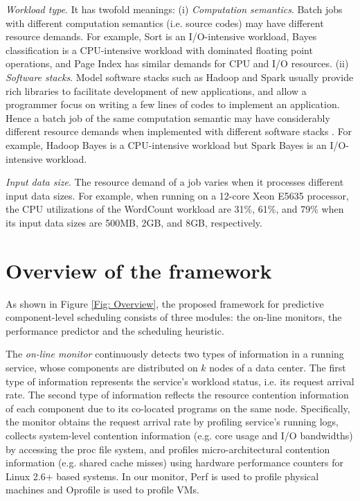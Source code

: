 \documentclass[10pt, conference, compsocconf]{IEEEtran}
\begin{document}
\emph{Workload type}. It has twofold meanings: (i) \emph{Computation semantics}. Batch jobs with different computation semantics (i.e. source codes) may have different resource demands. For example, Sort is an I/O-intensive workload, Bayes classification is a CPU-intensive workload with dominated floating point operations, and Page Index has similar demands for CPU and I/O resources. (ii) \emph{Software stacks}. Model software stacks such as Hadoop and Spark usually provide rich libraries to facilitate development of new applications, and allow a programmer focus on writing a few lines of codes to implement an application. Hence a batch job of the same computation semantic may have considerably different resource demands when implemented with different software stacks \cite{jia2014characterizing}. For example, Hadoop Bayes is a CPU-intensive workload but Spark Bayes is an I/O-intensive workload.

\emph{Input data size}. The resource demand of a job varies when it processes different input data sizes. For example, when running on a 12-core Xeon E5635 processor, the CPU utilizations of the WordCount workload are 31\%, 61\%, and 79\% when its input data sizes are 500MB, 2GB, and 8GB, respectively.




















\section{Overview of the framework} \label{Section: Overview of the framework}

As shown in Figure \ref{Fig: Overview}, the proposed framework for predictive component-level scheduling consists of three modules: the on-line monitors, the performance predictor and the scheduling heuristic.

The \emph{on-line monitor} continuously detects two types of information in a running service, whose components are distributed on $k$ nodes of a data center. The first type of information represents the service's workload status, i.e. its request arrival rate. The second type of information reflects the resource contention information of each component due to its co-located programs on the same node. Specifically, the monitor obtains the request arrival rate by profiling service's running logs, collects system-level contention information (e.g. core usage and I/O bandwidths) by accessing the proc file system, and profiles micro-architectural contention information (e.g. shared cache misses) using hardware performance counters for Linux 2.6+ based systems. In our monitor, Perf \cite{PerfWebsite} is used to profile physical machines and Oprofile \cite{OprofileWebsite} is used to profile VMs.
\end{document}
